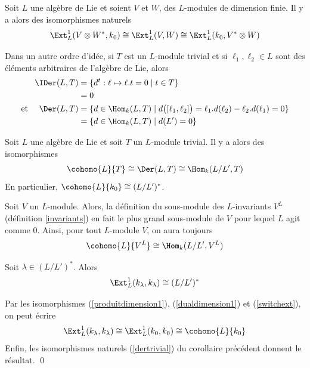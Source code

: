 \begin{Cor}
Soit $L$ une algèbre de Lie et soient $V$ et $W$, des $L$-modules de dimension finie. Il y a alors des isomorphismes naturels
\begin{equation} \label{switchext}
\Ext_L^1(V \otimes W^*,k_0) \cong \Ext_L^1(V,W) \cong \Ext_L^1(k_0,V^* \otimes W)
\end{equation}
\end{Cor}

Dans un autre ordre d'idée, si $T$ est un $L$-module trivial et si $\ell_1,\ell_2 \in L$ sont des éléments arbitraires de l'algèbre de Lie, alors 
\begin{align*}
\IDer(L,T) &= \{d^t : \ell \mapsto \ell.t = 0 \; | \; t \in T\}\\ 
&= 0\\
\text{et } \quad \Der(L, T) &= \{d \in \Hom_k(L,T) \; | \; d\big([\ell_1,\ell_2]\big) = \ell_1.d(\ell_2) - \ell_2.d(\ell_1) = 0\}\\
&= \{d \in \Hom_k(L,T) \; | \; d(L') = 0\}
\end{align*}

\begin{Cor} Soit $L$ une algèbre de Lie et soit $T$ un $L$-module trivial. Il y a alors des isomorphismes
\begin{equation} \label{dertrivial}
\cohomo{L}{T} \cong \Der(L,T) \cong \Hom_k(L/L',T)
\end{equation}
En particulier, $\cohomo{L}{k_0} \cong (L/L')^*$.
\end{Cor}

\begin{Rem} Soit $V$ un $L$-module. Alors, la définition du sous-module des $L$-invariants $V^L$ (définition \ref{invariants}) en fait le plus grand sous-module de $V$ pour lequel $L$ agit comme $0$. Ainsi, pour tout $L$-module $V$, on aura toujours 
$$ \cohomo{L}{V^L} \cong \Hom_k(L/L',V^L) $$
\end{Rem} 

\begin{Cor} Soit $\lambda \in (L/L')^*$. Alors 
\begin{equation} \label{extdimension1pareils}
\Ext_L^1(k_\lambda,k_\lambda) \cong (L/L')^*
\end{equation}
\begin{pre} Par les isomorphismes (\ref{produitdimension1}), (\ref{dualdimension1}) et  (\ref{switchext}), on peut écrire
$$ \Ext_L^1(k_\lambda,k_\lambda) \cong \Ext_L^1(k_0,k_0) \cong \cohomo{L}{k_0} $$
Enfin, les isomorphismes naturels (\ref{dertrivial}) du corollaire précédent donnent le résultat. \qed
\end{pre}
\end{Cor}


